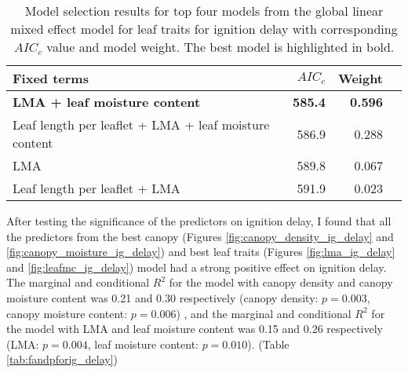 \documentclass{ttuthes2007}
\begin{document}
\begin{table}
  \centering
  \caption{Model selection results for top four models from the global linear
    mixed effect model for leaf traits for ignition delay with corresponding
    $AIC_{c}$ value and model weight. The best model is highlighted in bold.}
  \begin{tabular}{lrrr}
    \toprule
    \textbf{Fixed terms} & $AIC_{c}$ & \textbf{Weight}\\
    \midrule
    \textbf{LMA + leaf moisture content}    & \textbf{585.4} & \textbf{0.596} \\
    Leaf length per leaflet + LMA + leaf moisture content & 586.9          & 0.288          \\
    LMA                                                   & 589.8          & 0.067          \\
    Leaf length per leaflet + LMA                         & 591.9          & 0.023          \\
    \bottomrule
  \end{tabular}
  \label{tab:leaf_models_ignition_delay}
\end{table}





After testing the significance of the predictors on ignition delay, I found that all the predictors from the best canopy (Figures \ref{fig:canopy_density_ig_delay} and \ref{fig:canopy_moisture_ig_delay}) and best leaf traits (Figures \ref{fig:lma_ig_delay} and \ref{fig:leafmc_ig_delay}) model had a strong positive effect on ignition delay. The marginal and conditional $R^2$ for the model with canopy density and canopy moisture content was 0.21 and 0.30 respectively (canopy density: $p = 0.003$, canopy moisture content: $p = 0.006$) , and the marginal and conditional $R^2$ for the model with LMA and leaf moisture content was 0.15 and 0.26 respectively (LMA: $p = 0.004$, leaf moisture content: $p = 0.010$). (Table \ref{tab:fandpforig_delay})
\end{document}
